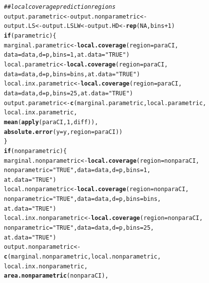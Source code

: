 \documentclass[11pt]{article}\usepackage[]{graphicx}\usepackage[]{color}
\makeatletter
\newcommand{\hlnum}[1]{\textcolor[rgb]{0.686,0.059,0.569}{#1}}%
\newcommand{\hlstr}[1]{\textcolor[rgb]{0.192,0.494,0.8}{#1}}%
\newcommand{\hlcom}[1]{\textcolor[rgb]{0.678,0.584,0.686}{\textit{#1}}}%
\newcommand{\hlopt}[1]{\textcolor[rgb]{0,0,0}{#1}}%
\newcommand{\hlstd}[1]{\textcolor[rgb]{0.345,0.345,0.345}{#1}}%
\newcommand{\hlkwa}[1]{\textcolor[rgb]{0.161,0.373,0.58}{\textbf{#1}}}%
\newcommand{\hlkwb}[1]{\textcolor[rgb]{0.69,0.353,0.396}{#1}}%
\newcommand{\hlkwc}[1]{\textcolor[rgb]{0.333,0.667,0.333}{#1}}%
\newcommand{\hlkwd}[1]{\textcolor[rgb]{0.737,0.353,0.396}{\textbf{#1}}}%
\newenvironment{kframe}{%
 \def\at@end@of@kframe{}%
 \ifinner\ifhmode%
  \def\at@end@of@kframe{\end{minipage}}%
  \begin{minipage}{\columnwidth}%
 \fi\fi%
 \def\FrameCommand##1{\hskip\@totalleftmargin \hskip-\fboxsep
 \colorbox{shadecolor}{##1}\hskip-\fboxsep
     \hskip-\linewidth \hskip-\@totalleftmargin \hskip\columnwidth}%
 \MakeFramed {\advance\hsize-\width
   \@totalleftmargin\z@ \linewidth\hsize
   \@setminipage}}%
 {\par\unskip\endMakeFramed%
 \at@end@of@kframe}
\newenvironment{knitrout}{}{} %
\makeatother
\begin{document}
\begin{knitrout}
\begin{kframe}
\begin{alltt}
  \hlcom{## local coverage prediction regions}
  \hlstd{output.parametric} \hlkwb{<-} \hlstd{output.nonparametric} \hlkwb{<-}
    \hlstd{output.LS} \hlkwb{<-} \hlstd{output.LSLW} \hlkwb{<-} \hlstd{output.HD} \hlkwb{<-} \hlkwd{rep}\hlstd{(}\hlnum{NA}\hlstd{, bins} \hlopt{+} \hlnum{1}\hlstd{)}
  \hlkwa{if}\hlstd{(parametric)\{}
    \hlstd{marginal.parametric} \hlkwb{<-} \hlkwd{local.coverage}\hlstd{(}\hlkwc{region} \hlstd{= paraCI,}
      \hlkwc{data} \hlstd{= data,} \hlkwc{d} \hlstd{= p,} \hlkwc{bins} \hlstd{=} \hlnum{1}\hlstd{,} \hlkwc{at.data} \hlstd{=} \hlstr{"TRUE"}\hlstd{)}
    \hlstd{local.parametric} \hlkwb{<-} \hlkwd{local.coverage}\hlstd{(}\hlkwc{region} \hlstd{= paraCI,}
      \hlkwc{data} \hlstd{= data,} \hlkwc{d} \hlstd{= p,} \hlkwc{bins} \hlstd{= bins,} \hlkwc{at.data} \hlstd{=} \hlstr{"TRUE"}\hlstd{)}
    \hlstd{local.inx.parametric} \hlkwb{<-} \hlkwd{local.coverage}\hlstd{(}\hlkwc{region} \hlstd{= paraCI,}
      \hlkwc{data} \hlstd{= data,} \hlkwc{d} \hlstd{= p,} \hlkwc{bins} \hlstd{=} \hlnum{25}\hlstd{,} \hlkwc{at.data} \hlstd{=} \hlstr{"TRUE"}\hlstd{)}
    \hlstd{output.parametric} \hlkwb{<-} \hlkwd{c}\hlstd{(marginal.parametric, local.parametric,}
      \hlstd{local.inx.parametric,}
      \hlkwd{mean}\hlstd{(}\hlkwd{apply}\hlstd{(paraCI,} \hlnum{1}\hlstd{, diff)),}
      \hlkwd{absolute.error}\hlstd{(}\hlkwc{y} \hlstd{= y,} \hlkwc{region} \hlstd{= paraCI))}
  \hlstd{\}}
  \hlkwa{if}\hlstd{(nonparametric)\{}
    \hlstd{marginal.nonparametric} \hlkwb{<-} \hlkwd{local.coverage}\hlstd{(}\hlkwc{region} \hlstd{= nonparaCI,}
      \hlkwc{nonparametric} \hlstd{=} \hlstr{"TRUE"}\hlstd{,} \hlkwc{data} \hlstd{= data,} \hlkwc{d} \hlstd{= p,} \hlkwc{bins} \hlstd{=} \hlnum{1}\hlstd{,}
      \hlkwc{at.data} \hlstd{=} \hlstr{"TRUE"}\hlstd{)}
    \hlstd{local.nonparametric} \hlkwb{<-} \hlkwd{local.coverage}\hlstd{(}\hlkwc{region} \hlstd{= nonparaCI,}
      \hlkwc{nonparametric} \hlstd{=} \hlstr{"TRUE"}\hlstd{,} \hlkwc{data} \hlstd{= data,} \hlkwc{d} \hlstd{= p,} \hlkwc{bins} \hlstd{= bins,}
      \hlkwc{at.data} \hlstd{=} \hlstr{"TRUE"}\hlstd{)}
    \hlstd{local.inx.nonparametric} \hlkwb{<-} \hlkwd{local.coverage}\hlstd{(}\hlkwc{region} \hlstd{= nonparaCI,}
      \hlkwc{nonparametric} \hlstd{=} \hlstr{"TRUE"}\hlstd{,} \hlkwc{data} \hlstd{= data,} \hlkwc{d} \hlstd{= p,} \hlkwc{bins} \hlstd{=} \hlnum{25}\hlstd{,}
      \hlkwc{at.data} \hlstd{=} \hlstr{"TRUE"}\hlstd{)}
    \hlstd{output.nonparametric} \hlkwb{<-}
      \hlkwd{c}\hlstd{(marginal.nonparametric, local.nonparametric,}
        \hlstd{local.inx.nonparametric,}
        \hlkwd{area.nonparametric}\hlstd{(nonparaCI),}

\end{alltt}
\end{kframe}
\end{knitrout}
\end{document}
